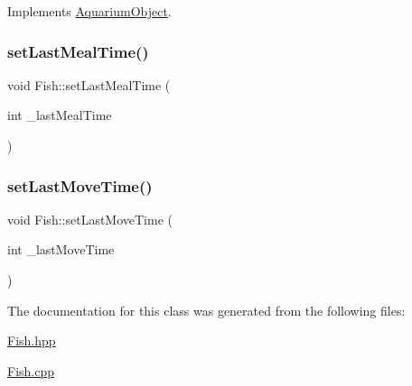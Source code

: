 Implements \mbox{\hyperlink{class_aquarium_object_a42c4de640f89ac8aebc26b7618578575}{Aquarium\+Object}}.

\mbox{\label{class_fish_a1f7311b9420fb5024765db52bcdb6cf3}} 
\subsubsection{\texorpdfstring{set\+Last\+Meal\+Time()}{setLastMealTime()}}
{\footnotesize\ttfamily void Fish\+::set\+Last\+Meal\+Time (\begin{DoxyParamCaption}\item[{int}]{\+\_\+last\+Meal\+Time }\end{DoxyParamCaption})}

\mbox{\label{class_fish_a49b56a52b365b3b492e519e4b27bc441}} 
\subsubsection{\texorpdfstring{set\+Last\+Move\+Time()}{setLastMoveTime()}}
{\footnotesize\ttfamily void Fish\+::set\+Last\+Move\+Time (\begin{DoxyParamCaption}\item[{int}]{\+\_\+last\+Move\+Time }\end{DoxyParamCaption})}



The documentation for this class was generated from the following files\+:\begin{DoxyCompactItemize}
\item 
\mbox{\hyperlink{_fish_8hpp}{Fish.\+hpp}}\item 
\mbox{\hyperlink{_fish_8cpp}{Fish.\+cpp}}\end{DoxyCompactItemize}
